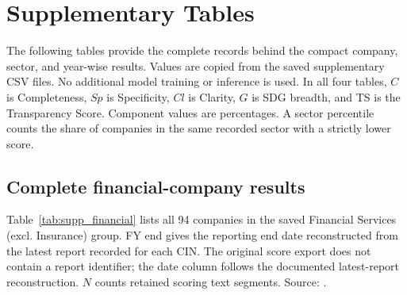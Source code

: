 \clearpage
\appendix
\section{Supplementary Tables}
\label{sec:supplementary}
\setcounter{table}{0}
\renewcommand{\thetable}{S\arabic{table}}
\renewcommand{\theHtable}{supp.\arabic{table}}

The following tables provide the complete records behind the compact company, sector, and year-wise results. Values are copied from the saved supplementary CSV files. No additional model training or inference is used. In all four tables, $C$ is Completeness, $Sp$ is Specificity, $Cl$ is Clarity, $G$ is SDG breadth, and TS is the Transparency Score. Component values are percentages. A sector percentile counts the share of companies in the same recorded sector with a strictly lower score.

\subsection{Complete financial-company results}

Table~\ref{tab:supp_financial} lists all 94 companies in the saved Financial Services (excl. Insurance) group. FY end gives the reporting end date reconstructed from the latest report recorded for each CIN. The original score export does not contain a report identifier; the date column follows the documented latest-report reconstruction. $N$ counts retained scoring text segments. Source: .

